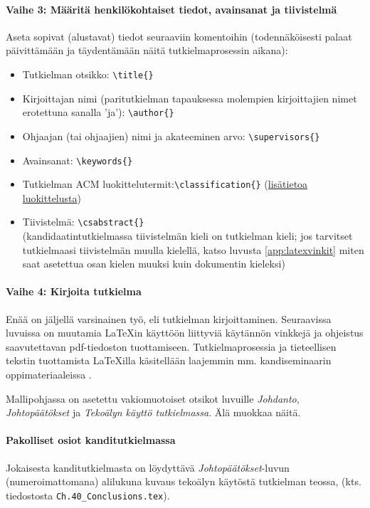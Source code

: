\documentclass[finnish, manual, a4paper]{csthesis}
\begin{document}
\paragraph{Vaihe 3: Määritä henkilökohtaiset tiedot, avainsanat ja tiivistelmä}
Aseta sopivat (alustavat) tiedot seuraaviin komentoihin (todennäköisesti palaat päivittämään ja täydentämään näitä tutkielmaprosessin aikana):
\begin{itemize}
\item Tutkielman otsikko: \texttt{\textbackslash title\{\}}
\item Kirjoittajan nimi (paritutkielman tapauksessa molempien kirjoittajien nimet erotettuna sanalla 'ja'): \texttt{\textbackslash author\{\}}
\item Ohjaajan (tai ohjaajien) nimi ja akateeminen arvo: \texttt{\textbackslash supervisors\{\}}
\item Avainsanat: \texttt{\textbackslash keywords\{\}}
\item Tutkielman ACM luokittelutermit:\texttt{\textbackslash classification\{\}} (\href{https://dl.acm.org/ccs}{lisätietoa luokittelusta})
\item Tiivistelmä: \texttt{\textbackslash csabstract\{\}} \\(kandidaatintutkielmassa tiivistelmän kieli on tutkielman kieli; jos tarvitset tutkielmaasi tiivistelmän muulla kielellä, katso luvusta \ref{app:latexvinkit} miten saat asetettua osan kielen muuksi kuin dokumentin kieleksi) 
\end{itemize}

\paragraph{Vaihe 4: Kirjoita tutkielma}
Enää on jäljellä varsinainen työ, eli tutkielman kirjoittaminen. 
Seuraavissa luvuissa on muutamia \LaTeX{}in käyttöön liittyviä käytännön vinkkejä ja ohjeistus saavutettavan pdf-tiedoston tuottamiseen. Tutkielmaprosessia ja tieteellisen tekstin tuottamista \LaTeX{}illa käsitellään laajemmin mm. kandiseminaarin oppimateriaaleissa \parencite{tieteellinenkirjoittaminen}.

Mallipohjassa on asetettu vakiomuotoiset otsikot luvuille {\em Johdanto}, {\em Johtopäätökset} ja {\em Tekoälyn käyttö tutkielmassa}. Älä muokkaa näitä. 

\paragraph{Pakolliset osiot kanditutkielmassa}
Jokaisesta kanditutkielmasta on löydyttävä {\em Johto\-pää\-tök\-set}-luvun (numeroimattomana) alilukuna kuvaus tekoälyn käytöstä tutkielman teossa,
(kts. tiedostosta \texttt{Ch.40\_Conclusions.tex}). 
\end{document}
